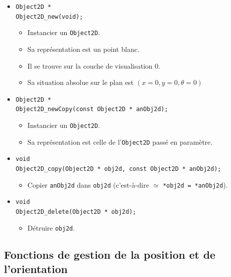 \documentclass[12pt]{article}
\begin{document}
\begin{itemize}
\item \verb!Object2D *! \\
      \verb!Object2D_new(void);!
      \begin{itemize}
      \item Instancier un \verb!Object2D!.
      \item Sa repr\'esentation est un point blanc.
      \item Il se trouve sur la couche de visualisation $0$.
      \item Sa situation absolue sur le plan est $(x=0,y=0,\theta=0)$
      \end{itemize}

\item \verb!Object2D *! \\
      \verb!Object2D_newCopy(const Object2D * anObj2d);!
      \begin{itemize}
      \item Instancier un \verb!Object2D!.
      \item Sa repr\'esentation est celle de l'\verb!Object2D! pass\'e
            en param\`etre.
      \end{itemize}

\item \verb!void! \\
      \verb!Object2D_copy(Object2D * obj2d, const Object2D * anObj2d);!
      \begin{itemize}
      \item  Copier \verb!anObj2d! dans \verb!obj2d!
            (c'est-\`a-dire $\simeq$ \verb!*obj2d = *anObj2d!).
      \end{itemize}

\item \verb!void! \\
      \verb!Object2D_delete(Object2D * obj2d);!
      \begin{itemize}
      \item D\'etruire \verb!obj2d!.
      \end{itemize}

\end{itemize}

\subsection{Fonctions de gestion de la position et de l'orientation}
\end{document}

